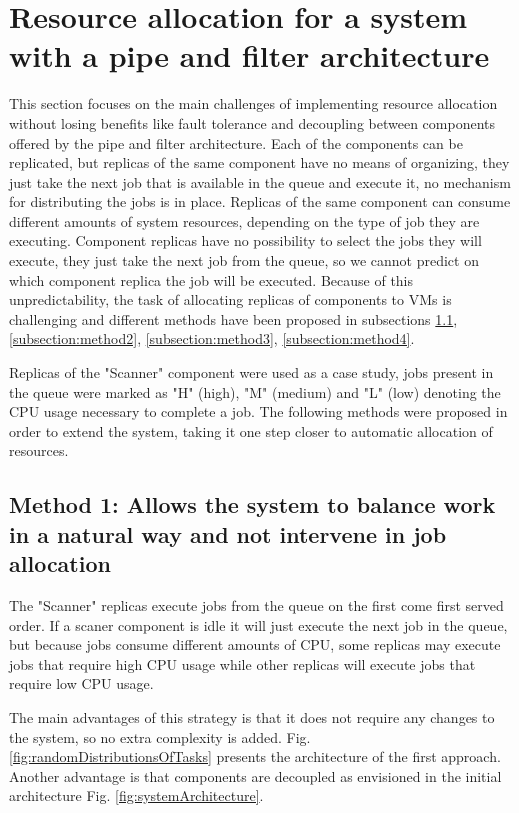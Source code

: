 \section{Resource allocation for a system with a pipe and filter architecture}
\label{sec:resourceAllocation}
This section focuses on the main challenges of implementing resource allocation without losing benefits like fault tolerance and decoupling between components offered by the pipe and filter architecture. Each of the components can be replicated, but replicas of the same component have no means of organizing, they just take the next job that is available in the queue and execute it, no mechanism for distributing the jobs is in place. Replicas of the same component can consume different amounts of system resources, depending on the type of job they are executing. Component replicas have no possibility to select the jobs they will execute, they just take the next job from the queue, so we cannot predict on which component replica the job will be executed. Because of this unpredictability, the task of allocating replicas of components to VMs is challenging and different methods have been proposed in subsections \ref{subsection:method1}, \ref{subsection:method2}, \ref{subsection:method3}, \ref{subsection:method4}.

Replicas of the "Scanner" component were used as a case study, jobs present in the queue were marked as "H" (high), "M" (medium) and "L" (low) denoting the CPU usage necessary to complete a job. The following methods were proposed in order to extend the system, taking it one step closer to automatic allocation of resources.

\subsection{Method 1: Allows the system to balance work in a natural way and not intervene in job allocation}
\label{subsection:method1}
The "Scanner" replicas execute jobs from the queue on the first come first served order. If a scaner component is idle it will just execute the next job in the queue, but because jobs consume different amounts of CPU, some replicas may execute jobs that require high CPU usage while other replicas will execute jobs that require low CPU usage.

The main advantages of this strategy is that it does not require any changes to the system, so no extra complexity is added. Fig. \ref{fig:randomDistributionsOfTasks} presents the architecture of the first approach. Another advantage is that components are decoupled as envisioned in the initial architecture Fig. \ref{fig:systemArchitecture}.

